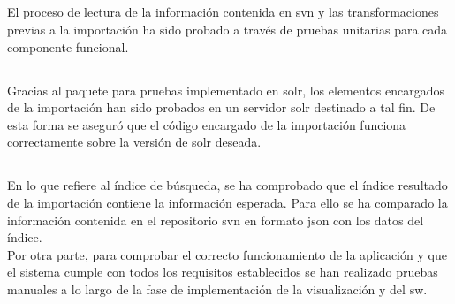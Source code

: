 \subsection{}
El proceso de lectura de la información contenida en \gls{svn} y las transformaciones previas a la importación ha sido probado a través de pruebas unitarias para cada componente funcional.

\subsection{} 
Gracias al paquete para pruebas implementado en \gls{solr}, los elementos encargados de la importación han sido probados en un servidor \gls{solr} destinado a tal fin. De esta forma se aseguró que el código encargado de la importación funciona correctamente sobre la versión de \gls{solr} deseada.

\subsection{}
En lo que refiere al índice de búsqueda, se ha comprobado que el índice resultado de la importación contiene la información esperada. Para ello se ha comparado la información contenida en el repositorio \gls{svn} en formato \gls{json} con los datos del índice.\\

Por otra parte, para comprobar el correcto funcionamiento de la aplicación y que el sistema cumple con todos los requisitos establecidos se han realizado pruebas manuales a lo largo de la fase de implementación de la visualización y del \gls{sw}.\\

